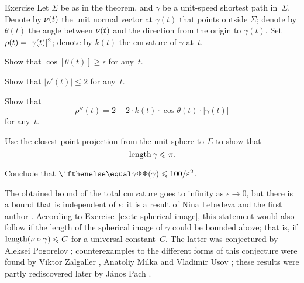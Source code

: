 \begin{thm}{Exercise}\label{ex:bound-tc}
Let $\Sigma$ be as in the theorem, and $\gamma$ be a unit-speed shortest path in~$\Sigma$.
Denote by $\nu(t)$ the unit normal vector at $\gamma(t)$ that points outside $\Sigma$;
denote by $\theta(t)$ the angle between $\nu(t)$ and the direction from the origin to $\gamma(t)$.
Set $\rho(t)\z=|\gamma(t)|^2$; denote by $k(t)$ the curvature of $\gamma$ at~$t$.

\begin{subthm}{}
Show that $\cos[\theta(t)]\ge \epsilon$ for any~$t$.
\end{subthm}

\begin{subthm}{}
 Show that $|\rho'(t)|\le 2$ for any~$t$.
\end{subthm}

\begin{subthm}{}
 Show that 
\[\rho''(t)=2-2\cdot k(t)\cdot \cos \theta(t)\cdot |\gamma(t)|\]
for any~$t$.
\end{subthm}

\begin{subthm}{}
 Use the closest-point projection from the unit sphere to $\Sigma$ to show that 
\[\mathop{\rm length}\nolimits \gamma\leqslant \pi.\]
\end{subthm}

\begin{subthm}{}
Conclude that $\tc\gamma\le 100/\epsilon^2$.
\end{subthm}

\end{thm}

The obtained bound of the total curvature goes to infinity as $\epsilon\to 0$,
but there is a bound that is independent of $\epsilon$;
it is a result of Nina Lebedeva and the first author \cite{lebedeva-petrunin}.
According to Exercise~\ref{ex:tc-spherical-image}, this statement would also follow if the length of the spherical image of $\gamma$ could be bounded above; 
that is, if $\mathop{\rm length}\nolimits(\nu\circ\gamma)\leqslant C$ for a universal constant~$C$.
The latter was conjectured by Aleksei Pogorelov \cite{pogorelov};
counterexamples to the different forms of this conjecture were found 
by Viktor Zalgaller \cite{zalgaller},
Anatoliy Milka \cite{milka}
and Vladimir Usov \cite{usov};
these results were partly rediscovered later 
by J\'{a}nos Pach \cite{pach}.
